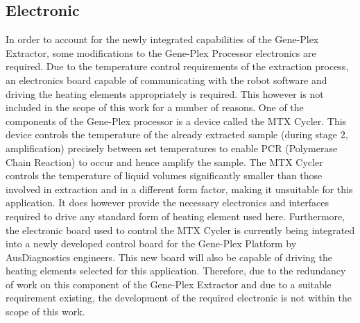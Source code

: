 \subsection{Electronic}
\label{sec:intro_electronics}
In order to account for the newly integrated capabilities of the Gene-Plex Extractor, some modifications to the Gene-Plex Processor electronics are required. Due to the temperature control requirements of the extraction process, an electronics board capable of communicating with the robot software and driving the heating elements appropriately is required. This however is not included in the scope of this work for a number of reasons. One of the components of the Gene-Plex processor is a device called the MTX Cycler. This device controls the temperature of the already extracted sample (during stage 2, amplification) precisely between set temperatures to enable PCR (Polymerase Chain Reaction) to occur and hence amplify the sample. The MTX Cycler controls the temperature of liquid volumes significantly smaller than those involved in extraction and in a different form factor, making it unsuitable for this application. It does however provide the necessary electronics and interfaces required to drive any standard form of heating element used here. Furthermore, the electronic board used to control the MTX Cycler is currently being integrated into a newly developed control board for the Gene-Plex Platform by AusDiagnostics engineers. This new board will also be capable of driving the heating elements selected for this application. Therefore, due to the redundancy of work on this component of the Gene-Plex Extractor and due to a suitable requirement existing, the development of the required electronic is not within the scope of this work.

